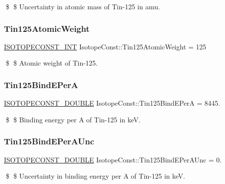 \$ \$ Uncertainty in atomic mass of Tin-\/125 in amu. \mbox{\label{group___isotope_const-_tin-_sn125_gab697f3550b03c3251bf1db919b042072}} 
\subsubsection{\texorpdfstring{Tin125\+Atomic\+Weight}{Tin125AtomicWeight}}
{\footnotesize\ttfamily \mbox{\hyperlink{group___isotope_const-_macros_ga5f18360b3e99483a35c32d789e62621c}{I\+S\+O\+T\+O\+P\+E\+C\+O\+N\+S\+T\+\_\+\+I\+NT}} Isotope\+Const\+::\+Tin125\+Atomic\+Weight = 125}

\$ \$ Atomic weight of Tin-\/125. \mbox{\label{group___isotope_const-_tin-_sn125_ga07bedd243e6c3301926f94cfa5f9cd2a}} 
\subsubsection{\texorpdfstring{Tin125\+Bind\+E\+PerA}{Tin125BindEPerA}}
{\footnotesize\ttfamily \mbox{\hyperlink{group___isotope_const-_macros_ga8f45a7272ce02c0b4c65c44636ed719a}{I\+S\+O\+T\+O\+P\+E\+C\+O\+N\+S\+T\+\_\+\+D\+O\+U\+B\+LE}} Isotope\+Const\+::\+Tin125\+Bind\+E\+PerA = 8445.}

\$ \$ Binding energy per A of Tin-\/125 in keV. \mbox{\label{group___isotope_const-_tin-_sn125_ga755d06a9157f4a595f0dcc515b75cd6a}} 
\subsubsection{\texorpdfstring{Tin125\+Bind\+E\+Per\+A\+Unc}{Tin125BindEPerAUnc}}
{\footnotesize\ttfamily \mbox{\hyperlink{group___isotope_const-_macros_ga8f45a7272ce02c0b4c65c44636ed719a}{I\+S\+O\+T\+O\+P\+E\+C\+O\+N\+S\+T\+\_\+\+D\+O\+U\+B\+LE}} Isotope\+Const\+::\+Tin125\+Bind\+E\+Per\+A\+Unc = 0.}

\$ \$ Uncertainty in binding energy per A of Tin-\/125 in keV. \mbox{\label{group___isotope_const-_tin-_sn125_ga1efae6dafda2c46a66914e699d32c961}} 

